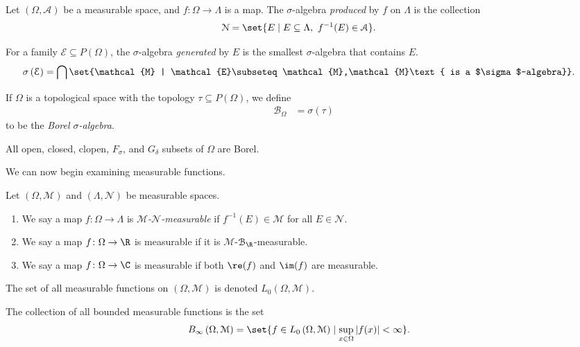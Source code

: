 \begin{definition}
Let $\left(\Omega,\mathcal{A}\right)$ be a measurable space, and $f\colon \Omega\rightarrow \Lambda$ is a map. The $\sigma$-algebra \textit{produced} by $f$ on $\Lambda$ is the collection
\begin{align*}
  \mathcal{N} &= \set{E\mid E\subseteq \Lambda,~f^{-1}(E) \in \mathcal{A}}.
\end{align*}
\end{definition}
\begin{definition}
  For a family $\mathcal{E}\subseteq P\left(\Omega\right)$, the $\sigma$-algebra \textit{generated} by $E$ is the smallest $\sigma$-algebra that contains $E$.
  \begin{align*}
    \sigma\left(\mathcal{E}\right) &= \bigcap\set{\mathcal{M} | \mathcal{E}\subseteq \mathcal{M},\mathcal{M}\text{ is a $\sigma$-algebra}}.
  \end{align*}
\end{definition}
\begin{definition}
  If $\Omega$ is a topological space with the topology $\tau\subseteq P(\Omega)$, we define
  \begin{align*}
    \mathcal{B}_{\Omega} &= \sigma\left(\tau\right)
  \end{align*}
  to be the \textit{Borel $\sigma$-algebra}.
\end{definition}
All open, closed, clopen, $F_{\sigma}$, and $G_{\delta}$ subsets of $\Omega$ are Borel.\break

We can now begin examining measurable functions.
\begin{definition}
  Let $\left(\Omega,\mathcal{M}\right)$ and $\left(\Lambda,\mathcal{N}\right)$ be measurable spaces.
  \begin{enumerate}[(1)]
    \item We say a map $f\colon \Omega\rightarrow \Lambda$ is \textit{$\mathcal{M}$-$\mathcal{N}$-measurable} if $f^{-1}\left(E\right)\in \mathcal{M}$ for all $E\in \mathcal{N}$.
    \item We say a map $f\colon \Omega\rightarrow \R$ is measurable if it is $\mathcal{M}$-$\mathcal{B}_{\R}$-measurable.
    \item We say a map $f\colon \Omega\rightarrow \C$ is measurable if both $\re(f)$ and $\im(f)$ are measurable.
  \end{enumerate}
  The set of all measurable functions on $\left(\Omega,\mathcal{M}\right)$ is denoted $L_{0}\left(\Omega,\mathcal{M}\right)$.\newline

  The collection of all bounded measurable functions is the set
  \begin{align*}
    B_{\infty}\left(\Omega,\mathcal{M}\right) &= \set{f\in L_0\left(\Omega,\mathcal{M}\right)\mid \sup_{x\in\Omega}\left\vert f(x) \right\vert < \infty}.
  \end{align*}
\end{definition}

